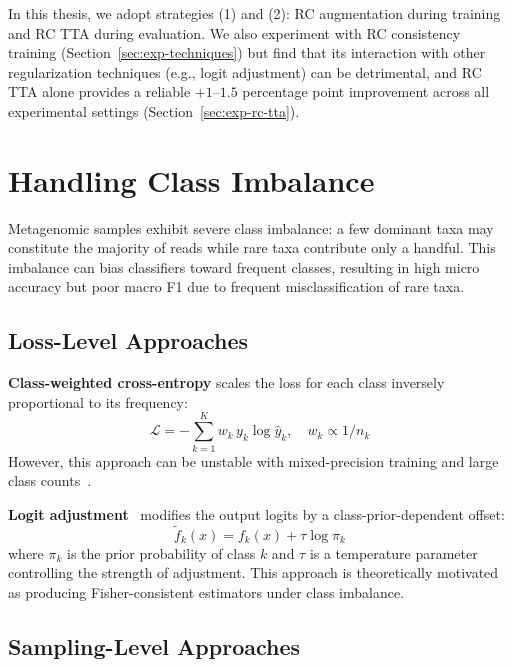 In this thesis, we adopt strategies (1) and (2): RC augmentation during training and RC TTA during evaluation. We also experiment with RC consistency training (Section~\ref{sec:exp-techniques}) but find that its interaction with other regularization techniques (e.g., logit adjustment) can be detrimental, and RC TTA alone provides a reliable $+1$--$1.5$ percentage point improvement across all experimental settings (Section~\ref{sec:exp-rc-tta}).

\section{Handling Class Imbalance}
\label{sec:bg-imbalance}

Metagenomic samples exhibit severe class imbalance: a few dominant taxa may constitute the majority of reads while rare taxa contribute only a handful. This imbalance can bias classifiers toward frequent classes, resulting in high micro accuracy but poor macro F1 due to frequent misclassification of rare taxa.

\subsection{Loss-Level Approaches}

\textbf{Class-weighted cross-entropy} scales the loss for each class inversely proportional to its frequency:
\begin{equation}
    \mathcal{L} = -\sum_{k=1}^{K} w_k \, y_k \log \hat{y}_k, \quad w_k \propto 1/n_k
\end{equation}
However, this approach can be unstable with mixed-precision training and large class counts~\cite{Cui2019}.

\textbf{Logit adjustment}~\cite{Menon2021} modifies the output logits by a class-prior-dependent offset:
\begin{equation}
    \tilde{f}_k(x) = f_k(x) + \tau \log \pi_k
    \label{eq:logit-adjustment}
\end{equation}
where $\pi_k$ is the prior probability of class $k$ and $\tau$ is a temperature parameter controlling the strength of adjustment. This approach is theoretically motivated as producing Fisher-consistent estimators under class imbalance.

\subsection{Sampling-Level Approaches}

